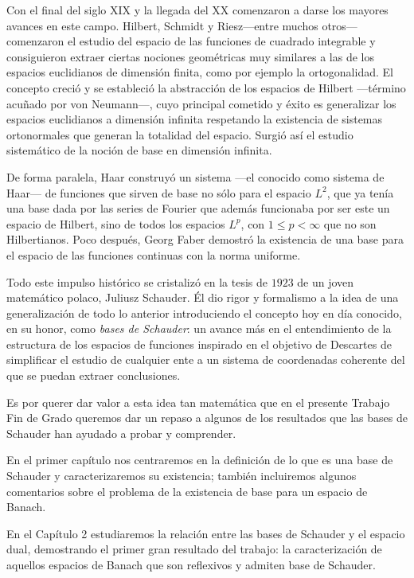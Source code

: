 \documentclass[
  spanish,
  letterpaper,
  DIV=11,
  numbers=noendperiod]{scrreprt}
\theoremstyle{definition}
\theoremstyle{remark}
\theoremstyle{definition}
\theoremstyle{exampstyle}
\theoremstyle{plain}
\theoremstyle{plain}
\theoremstyle{definition}
\theoremstyle{plain}
\theoremstyle{remark}
\begin{document}
Con el final del siglo XIX y la llegada del XX comenzaron a darse los
mayores avances en este campo. Hilbert, Schmidt y Riesz---entre muchos
otros--- comenzaron el estudio del espacio de las funciones de cuadrado
integrable y consiguieron extraer ciertas nociones geométricas muy
similares a las de los espacios euclidianos de dimensión finita, como
por ejemplo la ortogonalidad. El concepto creció y se estableció la
abstracción de los espacios de Hilbert ---término acuñado por von
Neumann---, cuyo principal cometido y éxito es generalizar los espacios
euclidianos a dimensión infinita respetando la existencia de sistemas
ortonormales que generan la totalidad del espacio. Surgió así el estudio
sistemático de la noción de base en dimensión infinita.

De forma paralela, Haar construyó un sistema ---el conocido como sistema
de Haar--- de funciones que sirven de base no sólo para el espacio
\(L^2\), que ya tenía una base dada por las series de Fourier que además
funcionaba por ser este un espacio de Hilbert, sino de todos los
espacios \(L^p\), con \(1\leq p<\infty\) que no son Hilbertianos. Poco
después, Georg Faber demostró la existencia de una base para el espacio
de las funciones continuas con la norma uniforme.

Todo este impulso histórico se cristalizó en la tesis de \(1923\) de un
joven matemático polaco, Juliusz Schauder. Él dio rigor y formalismo a
la idea de una generalización de todo lo anterior introduciendo el
concepto hoy en día conocido, en su honor, como
\emph{bases de Schauder}: un avance más en el entendimiento de la
estructura de los espacios de funciones inspirado en el objetivo de
Descartes de simplificar el estudio de cualquier ente a un sistema de
coordenadas coherente del que se puedan extraer conclusiones.

Es por querer dar valor a esta idea tan matemática que en el presente
Trabajo Fin de Grado queremos dar un repaso a algunos de los resultados
que las bases de Schauder han ayudado a probar y comprender.

En el primer capítulo nos centraremos en la definición de lo que es una
base de Schauder y caracterizaremos su existencia; también incluiremos
algunos comentarios sobre el problema de la existencia de base para un
espacio de Banach.

En el Capítulo 2 estudiaremos la relación entre las bases de Schauder y
el espacio dual, demostrando el primer gran resultado del trabajo: la
caracterización de aquellos espacios de Banach que son reflexivos y
admiten base de Schauder.
\end{document}
